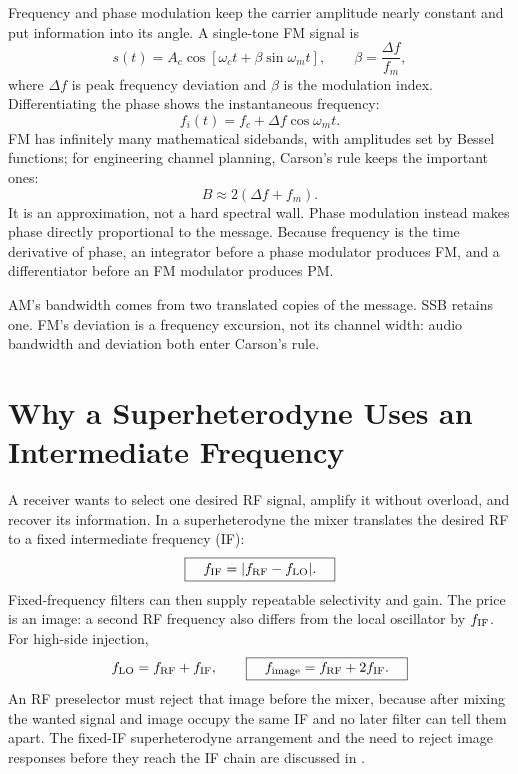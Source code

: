 Frequency and phase modulation keep the carrier amplitude nearly constant and
put information into its angle.  A single-tone FM signal is
\[
s(t)=A_c\cos[\omega_ct+\beta\sin\omega_mt],\qquad
\beta=\frac{\Delta f}{f_m},
\]
where \(\Delta f\) is peak frequency deviation and \(\beta\) is the modulation
index.  Differentiating the phase shows the instantaneous frequency:
\[
f_i(t)=f_c+\Delta f\cos\omega_mt.
\]
FM has infinitely many mathematical sidebands, with amplitudes set by Bessel
functions; for engineering channel planning, Carson's rule keeps the important
ones:
\[
\boxed{\quad B\approx2(\Delta f+f_m).\quad}
\]
It is an approximation, not a hard spectral wall.  Phase modulation instead
makes phase directly proportional to the message.  Because frequency is the
time derivative of phase, an integrator before a phase modulator produces FM,
and a differentiator before an FM modulator produces PM.

\begin{exambox}
AM's bandwidth comes from two translated copies of the message.  SSB retains one.
FM's deviation is a frequency excursion, not its channel width: audio bandwidth
and deviation both enter Carson's rule.
\end{exambox}

\section{Why a Superheterodyne Uses an Intermediate Frequency}
\label{sec:receiverarchitecture}
A receiver wants to select one desired RF signal, amplify it without overload,
and recover its information.  In a superheterodyne the mixer translates the
desired RF to a fixed intermediate frequency (IF):
\[
\boxed{\quad f_{\rm IF}=|f_{\rm RF}-f_{\rm LO}|.\quad}
\]
Fixed-frequency filters can then supply repeatable selectivity and gain.  The
price is an image: a second RF frequency also differs from the local oscillator
by \(f_{\rm IF}\).  For high-side injection,
\[
f_{\rm LO}=f_{\rm RF}+f_{\rm IF},\qquad
\boxed{\quad f_{\rm image}=f_{\rm RF}+2f_{\rm IF}.\quad}
\]
An RF preselector must reject that image before the mixer, because after mixing
the wanted signal and image occupy the same IF and no later filter can tell them
apart.
The fixed-IF superheterodyne arrangement and the need to reject image responses before
they reach the IF chain are discussed in
\cite[pp.~123--125]{logvinov2022receivers}.

